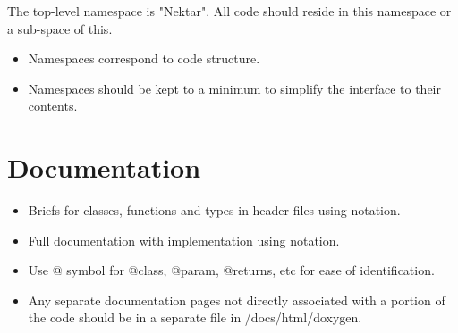 The top-level namespace is "Nektar". All code should reside in this namespace or
a sub-space of this.

\begin{itemize}
\item Namespaces correspond to code structure.
\item Namespaces should be kept to a minimum to simplify the interface to their
contents.
\end{itemize}

\section{Documentation}
\begin{itemize}
\item Briefs for classes, functions and types in header files using
\inlsh{///} notation.
\item Full documentation with implementation using 
notation.
\item Use @ symbol for @class, @param, @returns, etc for ease of identification.
\item Any separate documentation pages not directly associated with a portion of
the code should be in a separate file in /docs/html/doxygen.
\end{itemize}
